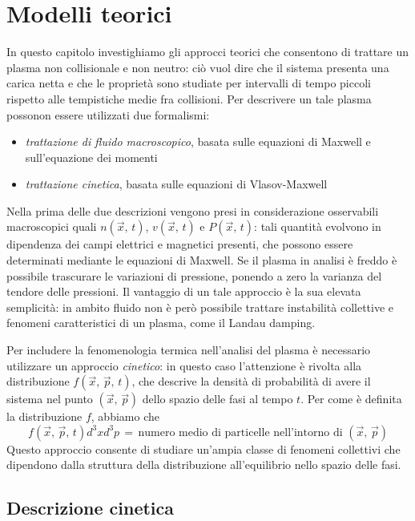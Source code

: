\chapter{Modelli teorici}

In questo capitolo investighiamo gli approcci teorici che consentono di trattare un plasma non collisionale e non neutro: ciò
vuol dire che il sistema presenta una carica netta e che le proprietà sono studiate per intervalli di tempo piccoli rispetto
alle tempistiche medie fra collisioni. Per descrivere un tale plasma possonon essere utilizzati due formalismi:
\begin{itemize}
    \item \textit{trattazione di fluido macroscopico}, basata sulle equazioni di Maxwell e sull'equazione dei momenti
    \item \textit{trattazione cinetica}, basata sulle equazioni di Vlasov-Maxwell
\end{itemize}
Nella prima delle due descrizioni vengono presi in considerazione osservabili macroscopici quali $n\left(\vec{x},\,t\right)$, 
$v\left(\vec{x},\,t\right)$ e $P\left(\vec{x},\,t\right)$: tali quantità evolvono in dipendenza dei campi elettrici e magnetici
presenti, che possono essere determinati mediante le equazioni di Maxwell. Se il plasma in analisi è freddo è possibile trascurare
le variazioni di pressione, ponendo a zero la varianza del tendore delle pressioni. Il vantaggio di un tale approccio è la sua 
elevata semplicità: in ambito fluido non è però possibile trattare instabilità collettive e fenomeni caratteristici di un plasma, 
come il Landau damping.

Per includere la fenomenologia termica nell'analisi del plasma è necessario utilizzare un approccio \textit{cinetico}: in questo
caso l'attenzione è rivolta alla distribuzione $f\left(\vec{x},\,\vec{p},\,t\right)$, che descrive la densità di probabilità di 
avere il sistema nel punto $\left(\vec{x},\,\vec{p}\right)$ dello spazio delle fasi al tempo $t$. Per come è definita la
distribuzione $f$, abbiamo che
$$f\left(\vec{x},\,\vec{p},\,t\right)d^3xd^3p\,=\,\text{numero medio di particelle nell'intorno di } \left(\vec{x},\,\vec{p}\right)$$
Questo approccio consente di studiare un'ampia classe di fenomeni collettivi che dipendono dalla struttura della distribuzione
all'equilibrio nello spazio delle fasi.

\section{Descrizione cinetica}

